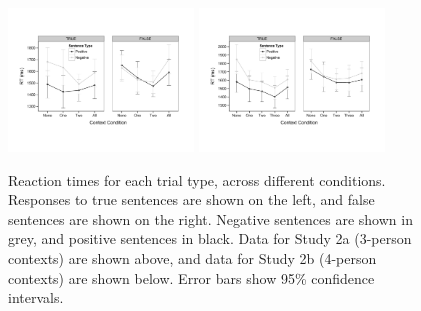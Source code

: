 \documentclass[10pt,letterpaper]{article}
\begin{document}

\begin{figure}
\begin{center} 
\includegraphics[height=1.5in]{figures/study2a_linegraph.pdf}
\includegraphics[height=1.5in]{figures/study2b_linegraph.pdf}
\caption{\label{fig:e2line} Reaction times for each trial type, across different conditions. Responses to true sentences are shown on the left, and false sentences are shown on the right.  Negative sentences are shown in grey, and positive sentences in black.  Data for Study 2a (3-person contexts) are shown above, and data for Study 2b (4-person contexts) are shown below.  Error bars show 95\% confidence intervals.  }
\end{center} 
\end{figure}

\end{document}
